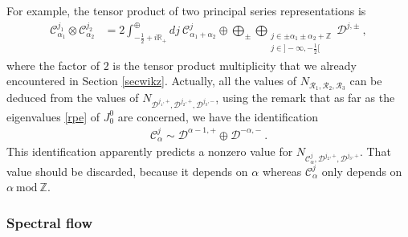\documentclass[12pt, a4paper, notitlepage, twoside]{report}
\numberwithin{equation}{section}
\theoremstyle{break}
\begin{document}
For example, the tensor product of two principal series representations is
\begin{align}
 \mathcal{C}^{j_1}_{\alpha_1}\otimes \mathcal{C}^{j_2}_{\alpha_2} &= 2\int^\oplus_{-\frac12+i{\mathbb{R}}_+} dj\ \mathcal{C}^j_{\alpha_1+\alpha_2} 
\oplus \bigoplus_\pm \bigoplus_{\substack{j\in \pm\alpha_1\pm\alpha_2+{\mathbb{Z}}\\ j\in]-\infty,-\frac12[}} \mathcal{D}^{j,\pm} \ ,
\label{coc}
\end{align}
where the factor of $2$ is the tensor product multiplicity that we already encountered in Section \ref{secwikz}.
Actually, all the values of $N_{\mathcal{R}_1,\mathcal{R}_2,\mathcal{R}_3}$ can be deduced from the values of $N_{\mathcal{D}^{j_1,+},\mathcal{D}^{j_2,+},\mathcal{D}^{j_3,-}}$, using the remark that as far as the eigenvalues \eqref{rpe} of $J^0_0$ are concerned, we have the identification
\begin{align}
 \mathcal{C}^j_\alpha \sim \mathcal{D}^{\alpha-1,+} \oplus \mathcal{D}^{-\alpha,-}\ .
\label{cjdd}
\end{align}
This identification apparently predicts a nonzero value for $N_{\mathcal{C}^j_\alpha,\mathcal{D}^{j_2,+},\mathcal{D}^{j_3,+}}$.
That value should be discarded, because it depends on $\alpha$ whereas $\mathcal{C}^j_\alpha$ only depends on $\alpha\ \text{mod}\ {\mathbb{Z}}$.

\subsubsection{Spectral flow}
\end{document}
